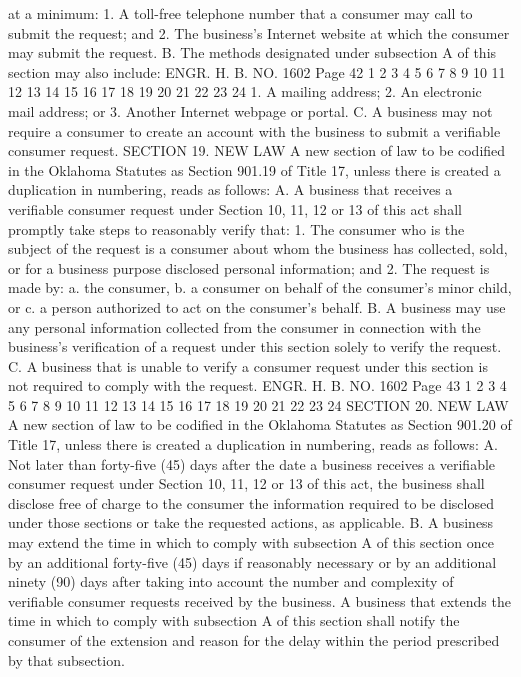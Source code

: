 at a minimum:
1. A toll-free telephone number that a consumer may call to
submit the request; and
2. The business's Internet website at which the consumer may
submit the request.
B. The methods designated under subsection A of this section
may also include:
ENGR. H. B. NO. 1602 Page 42
1
2
3
4
5
6
7
8
9
10
11
12
13
14
15
16
17
18
19
20
21
22
23
24
1. A mailing address;
2. An electronic mail address; or
3. Another Internet webpage or portal.
C. A business may not require a consumer to create an account
with the business to submit a verifiable consumer request.
SECTION 19. NEW LAW A new section of law to be codified
in the Oklahoma Statutes as Section 901.19 of Title 17, unless there
is created a duplication in numbering, reads as follows:
A. A business that receives a verifiable consumer request under
Section 10, 11, 12 or 13 of this act shall promptly take steps to
reasonably verify that:
1. The consumer who is the subject of the request is a consumer
about whom the business has collected, sold, or for a business
purpose disclosed personal information; and
2. The request is made by:
a. the consumer,
b. a consumer on behalf of the consumer's minor child, or
c. a person authorized to act on the consumer's behalf.
B. A business may use any personal information collected from
the consumer in connection with the business's verification of a
request under this section solely to verify the request.
C. A business that is unable to verify a consumer request under
this section is not required to comply with the request.
ENGR. H. B. NO. 1602 Page 43
1
2
3
4
5
6
7
8
9
10
11
12
13
14
15
16
17
18
19
20
21
22
23
24
SECTION 20. NEW LAW A new section of law to be codified
in the Oklahoma Statutes as Section 901.20 of Title 17, unless there
is created a duplication in numbering, reads as follows:
A. Not later than forty-five (45) days after the date a
business receives a verifiable consumer request under Section 10,
11, 12 or 13 of this act, the business shall disclose free of charge
to the consumer the information required to be disclosed under those
sections or take the requested actions, as applicable.
B. A business may extend the time in which to comply with
subsection A of this section once by an additional forty-five (45)
days if reasonably necessary or by an additional ninety (90) days
after taking into account the number and complexity of verifiable
consumer requests received by the business. A business that extends
the time in which to comply with subsection A of this section shall
notify the consumer of the extension and reason for the delay within
the period prescribed by that subsection.

